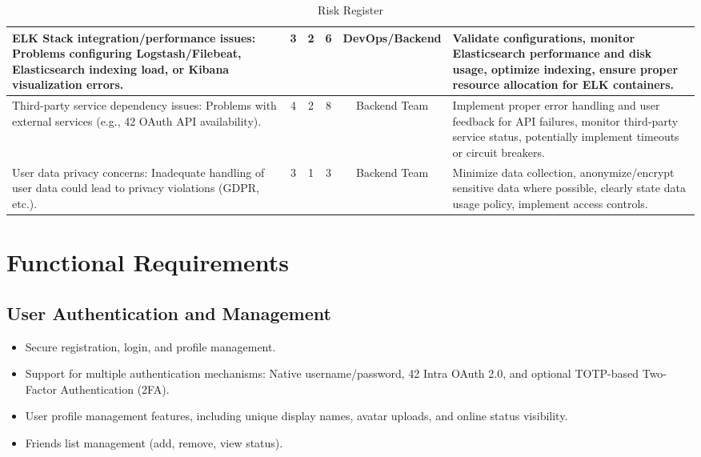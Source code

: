 \begin{table}[H]
\begin{tabular}{|p{4cm}|c|c|c|c|p{5.5cm}|}
    \hline
    ELK Stack integration/performance issues: Problems configuring Logstash/Filebeat, Elasticsearch indexing load, or Kibana visualization errors. & 3 & 2 & 6 & DevOps/Backend & Validate configurations, monitor Elasticsearch performance and disk usage, optimize indexing, ensure proper resource allocation for ELK containers. \\
    \hline
    Third-party service dependency issues: Problems with external services (e.g., 42 OAuth API availability). & 4 & 2 & 8 & Backend Team & Implement proper error handling and user feedback for API failures, monitor third-party service status, potentially implement timeouts or circuit breakers. \\
    \hline
    User data privacy concerns: Inadequate handling of user data could lead to privacy violations (GDPR, etc.). & 3 & 1 & 3 & Backend Team & Minimize data collection, anonymize/encrypt sensitive data where possible, clearly state data usage policy, implement access controls. \\
    \hline
    \end{tabular}
    \caption{Risk Register}
    \label{tab:risk_register}
\end{table}

\section{Functional Requirements}
\subsection*{User Authentication and Management}
\begin{itemize}
    \item Secure registration, login, and profile management.
    \item Support for multiple authentication mechanisms: Native username/password, 42 Intra OAuth 2.0, and optional TOTP-based Two-Factor Authentication (2FA).
    \item User profile management features, including unique display names, avatar uploads, and online status visibility.
    \item Friends list management (add, remove, view status).
\end{itemize}

